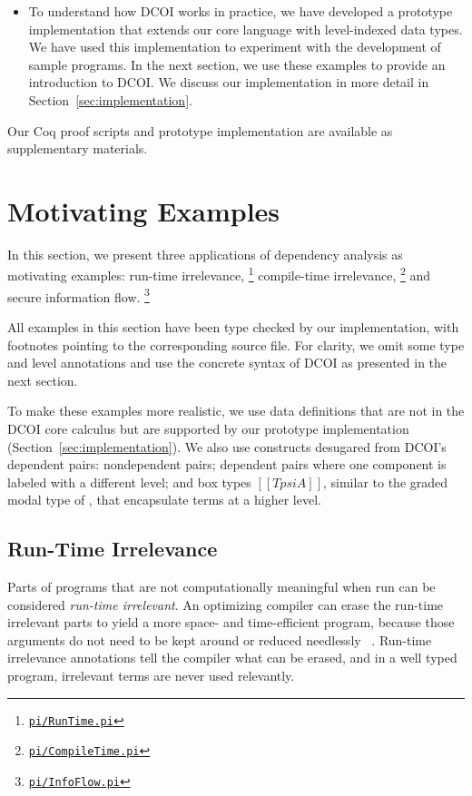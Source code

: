 \documentclass[acmsmall]{acmart}
\newcommand{\jws}[1]{}
\newcommand{\name}{DCOI\xspace}
\newcommand{\dotpi}[2]{\href{#1/#2}{\texttt{#2}}}
\newlength{\punctwidth}
\newcommand{\punctstack}[1]{#1%
  \settowidth{\punctwidth}{#1}%
  \hspace*{-\the\punctwidth}%
}
\begin{document}
\begin{itemize}
\item To understand how \name works in practice, we have developed a
  prototype implementation that extends our core language with level-indexed data
  types. We have used this implementation to experiment with the development
  of sample programs. In the next section, we use these examples to provide an
  introduction to \name. We discuss our implementation in more detail in
  Section~\ref{sec:implementation}.

\end{itemize}

Our Coq proof scripts and prototype implementation are available
as supplementary materials.

\section{Motivating Examples}
\label{sec:examples}

In this section,
we present three applications of dependency analysis as motivating examples:
run-time irrelevance\punctstack{,}\footnote{\dotpi{impl}{pi/RunTime.pi}}
compile-time irrelevance\punctstack{,}\footnote{\dotpi{impl}{pi/CompileTime.pi}}
and secure information flow\punctstack{.}\footnote{\dotpi{impl}{pi/InfoFlow.pi}}

All examples in this section have been type checked by our implementation,
with footnotes pointing to the corresponding source file. For clarity, we omit
some type and level annotations and use the concrete syntax of \name{} as
presented in the next section.

To make these examples more realistic, we use data definitions that are not in
the \name{} core calculus but are supported by our prototype implementation
(Section~\ref{sec:implementation}).  We also use constructs desugared from
\name{}'s dependent pairs: nondependent pairs; dependent pairs where one
component is labeled with a different level; and box types $[[T psi A]]$,
similar to the graded modal type of \citet{abadi1999core}, that encapsulate
terms at a higher level.

\subsection{Run-Time Irrelevance}
\label{sec:runtimeirrel}

Parts of programs that are not computationally meaningful when run
can be considered \textit{run-time irrelevant}.
An optimizing compiler can erase the run-time irrelevant parts
to yield a more space- and time-efficient program,
because those arguments do not need to be kept around or reduced needlessly
~\citep{paulinmohring1989coc,brady:phd}.
Run-time irrelevance annotations tell the compiler what can be erased,
and in a well typed program, irrelevant terms are never used relevantly.
\end{document}
